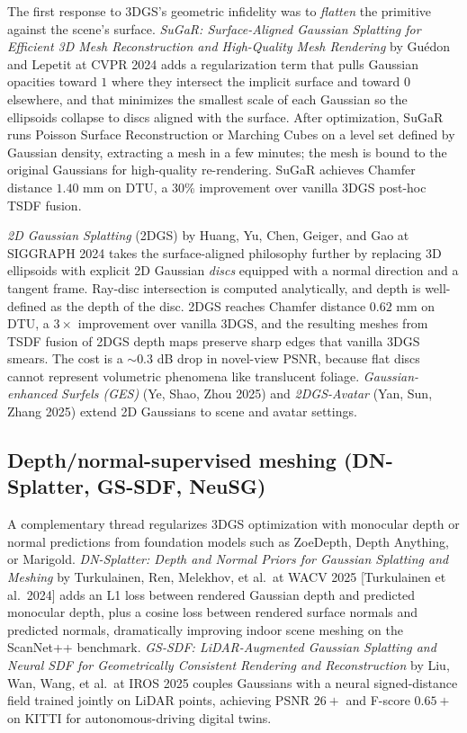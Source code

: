 \documentclass{article}
\begin{document}
The first response to 3DGS's geometric infidelity was to \emph{flatten} the primitive against the scene's surface. \emph{SuGaR: Surface-Aligned Gaussian Splatting for Efficient 3D Mesh Reconstruction and High-Quality Mesh Rendering} by Guédon and Lepetit at CVPR 2024 \cite{gudon2024sugarsurfacealigne} adds a regularization term that pulls Gaussian opacities toward \(1\) where they intersect the implicit surface and toward \(0\) elsewhere, and that minimizes the smallest scale of each Gaussian so the ellipsoids collapse to discs aligned with the surface. After optimization, SuGaR runs Poisson Surface Reconstruction or Marching Cubes on a level set defined by Gaussian density, extracting a mesh in a few minutes; the mesh is bound to the original Gaussians for high-quality re-rendering. SuGaR achieves Chamfer distance \(1.40\) mm on DTU, a \(30\)\% improvement over vanilla 3DGS post-hoc TSDF fusion.

\emph{2D Gaussian Splatting} (2DGS) by Huang, Yu, Chen, Geiger, and Gao at SIGGRAPH 2024 \cite{huang20242dgaussiansplattin} takes the surface-aligned philosophy further by replacing 3D ellipsoids with explicit 2D Gaussian \emph{discs} equipped with a normal direction and a tangent frame. Ray-disc intersection is computed analytically, and depth is well-defined as the depth of the disc. 2DGS reaches Chamfer distance \(0.62\) mm on DTU, a \(3\times\) improvement over vanilla 3DGS, and the resulting meshes from TSDF fusion of 2DGS depth maps preserve sharp edges that vanilla 3DGS smears. The cost is a \(\sim0.3\) dB drop in novel-view PSNR, because flat discs cannot represent volumetric phenomena like translucent foliage. \emph{Gaussian-enhanced Surfels (GES)} (Ye, Shao, Zhou 2025) and \emph{2DGS-Avatar} (Yan, Sun, Zhang 2025) extend 2D Gaussians to scene and avatar settings.

\subsection{Depth/normal-supervised meshing (DN-Splatter, GS-SDF, NeuSG)}\label{depthnormal-supervised-meshing-dn-splatter-gs-sdf-neusg}

A complementary thread regularizes 3DGS optimization with monocular depth or normal predictions from foundation models such as ZoeDepth, Depth Anything, or Marigold. \emph{DN-Splatter: Depth and Normal Priors for Gaussian Splatting and Meshing} by Turkulainen, Ren, Melekhov, et al.~at WACV 2025 {[}Turkulainen et al.~2024{]} adds an L1 loss between rendered Gaussian depth and predicted monocular depth, plus a cosine loss between rendered surface normals and predicted normals, dramatically improving indoor scene meshing on the ScanNet++ benchmark. \emph{GS-SDF: LiDAR-Augmented Gaussian Splatting and Neural SDF for Geometrically Consistent Rendering and Reconstruction} by Liu, Wan, Wang, et al.~at IROS 2025 \cite{liu2025asurveyof3dreconst} couples Gaussians with a neural signed-distance field trained jointly on LiDAR points, achieving PSNR \(26+\) and F-score \(0.65+\) on KITTI for autonomous-driving digital twins.
\end{document}
